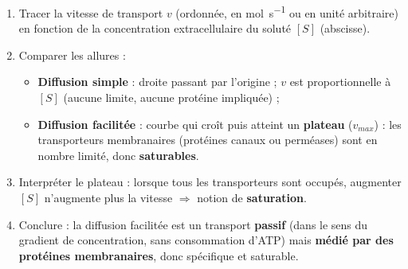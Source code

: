 \documentclass[11pt]{article}
\newcommand{\cle}[1]{{\popxbold\color{popdark}#1}}
\begin{document}
\begin{methode}
\begin{enumerate}
\item \cle{Tracer} la vitesse de transport $v$ (ordonnée, en \si{mol.s^{-1}} ou en unité arbitraire) en fonction de la concentration extracellulaire du soluté $[S]$ (abscisse).
\item \cle{Comparer les allures} :
\begin{itemize}
\item \textbf{Diffusion simple} : droite passant par l'origine ; $v$ est proportionnelle à $[S]$ (aucune limite, aucune protéine impliquée) ;
\item \textbf{Diffusion facilitée} : courbe qui croît puis atteint un \textbf{plateau} ($v_{max}$) : les transporteurs membranaires (protéines canaux ou perméases) sont en nombre limité, donc \textbf{saturables}.
\end{itemize}
\item \cle{Interpréter le plateau} : lorsque tous les transporteurs sont occupés, augmenter $[S]$ n'augmente plus la vitesse $\Rightarrow$ notion de \textbf{saturation}.
\item \cle{Conclure} : la diffusion facilitée est un transport \textbf{passif} (dans le sens du gradient de concentration, sans consommation d'ATP) mais \textbf{médié par des protéines membranaires}, donc spécifique et saturable.
\end{enumerate}
\end{methode}
\end{document}
